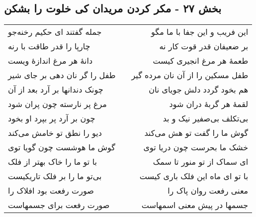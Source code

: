 \begin{center}
\section*{بخش ۲۷ - مکر کردن مریدان کی خلوت را بشکن}
\label{sec:sh027}
\begin{longtable}{l p{0.5cm} r}
جمله گفتند ای حکیم رخنه‌جو
&&
این فریب و این جفا با ما مگو
\\
چارپا را قدر طاقت با رنه
&&
بر ضعیفان قدر قوت کار نه
\\
دانهٔ هر مرغ اندازهٔ ویست
&&
طعمهٔ هر مرغ انجیری کیست
\\
طفل را گر نان دهی بر جای شیر
&&
طفل مسکین را از آن نان مرده گیر
\\
چونک دندانها بر آرد بعد از آن
&&
هم بخود گردد دلش جویای نان
\\
مرغ پر نارسته چون پران شود
&&
لقمهٔ هر گربهٔ دران شود
\\
چون بر آرد پر بپرد او بخود
&&
بی‌تکلف بی‌صفیر نیک و بد
\\
دیو را نطق تو خامش می‌کند
&&
گوش ما را گفت تو هش می‌کند
\\
گوش ما هوشست چون گویا توی
&&
خشک ما بحرست چون دریا توی
\\
با تو ما را خاک بهتر از فلک
&&
ای سماک از تو منور تا سمک
\\
بی‌تو ما را بر فلک تاریکیست
&&
با تو ای ماه این فلک باری کیست
\\
صورت رفعت بود افلاک را
&&
معنی رفعت روان پاک را
\\
صورت رفعت برای جسمهاست
&&
جسمها در پیش معنی اسمهاست
\\
\end{longtable}
\end{center}
